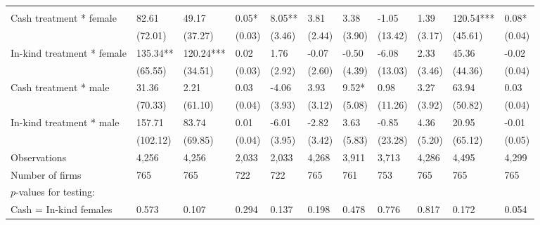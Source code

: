 \begin{table}[H]
{\begin{tabular}{lllllllllll}
\cmidrule(l{3pt}r{3pt}){2-2} \cmidrule(l{3pt}r{3pt}){3-3} \cmidrule(l{3pt}r{3pt}){4-4} \cmidrule(l{3pt}r{3pt}){5-5} \cmidrule(l{3pt}r{3pt}){6-6} \cmidrule(l{3pt}r{3pt}){7-7} \cmidrule(l{3pt}r{3pt}){8-8} \cmidrule(l{3pt}r{3pt}){9-9} \cmidrule(l{3pt}r{3pt}){10-10} \cmidrule(l{3pt}r{3pt}){11-11}
\addlinespace[0.3em]
\multicolumn{11}{l}{\textbf{Panel A: Males and females}}\\
\hspace{1em}Cash treatment * female & 82.61 & 49.17 & 0.05* & 8.05** & 3.81 & 3.38 & -1.05 & 1.39 & 120.54*** & 0.08*\\
\hspace{1em} & (72.01) & (37.27) & (0.03) & (3.46) & (2.44) & (3.90) & (13.42) & (3.17) & (45.61) & (0.04)\\
\hspace{1em}In-kind treatment * female & 135.34** & 120.24*** & 0.02 & 1.76 & -0.07 & -0.50 & -6.08 & 2.33 & 45.36 & -0.02\\
\hspace{1em} & (65.55) & (34.51) & (0.03) & (2.92) & (2.60) & (4.39) & (13.03) & (3.46) & (44.36) & (0.04)\\
\hspace{1em}Cash treatment * male & 31.36 & 2.21 & 0.03 & -4.06 & 3.93 & 9.52* & 0.98 & 3.27 & 63.94 & 0.03\\
\hspace{1em} & (70.33) & (61.10) & (0.04) & (3.93) & (3.12) & (5.08) & (11.26) & (3.92) & (50.82) & (0.04)\\
\hspace{1em}In-kind treatment * male & 157.71 & 83.74 & 0.01 & -6.01 & -2.82 & 3.63 & -0.85 & 4.36 & 20.95 & -0.01\\
\hspace{1em} & (102.12) & (69.85) & (0.04) & (3.95) & (3.42) & (5.83) & (23.28) & (5.20) & (65.12) & (0.05)\\
\hspace{1em}Observations & 4,256 & 4,256 & 2,033 & 2,033 & 4,268 & 3,911 & 3,713 & 4,286 & 4,495 & 4,299\\
\hspace{1em}Number of firms & 765 & 765 & 722 & 722 & 765 & 761 & 753 & 765 & 765 & 765\\
\hspace{1em}$p$-values for testing: &  &  &  &  &  &  &  &  &  \vphantom{1}& \\
\hspace{1em}\hspace{1em} Cash = In-kind females & 0.573 & 0.107 & 0.294 & 0.137 & 0.198 & 0.478 & 0.776 & 0.817 & 0.172 & 0.054\\

\end{tabular}}
\end{table}
